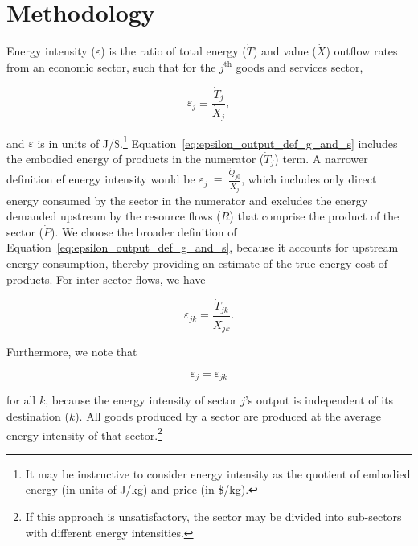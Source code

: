 \section{Methodology}

Energy intensity ($\varepsilon$)
is the ratio 
of total energy ($\dot{T}$) 
and value ($\dot{X}$) outflow rates 
from an economic sector, 
such that for the $j^{\mathrm{th}}$ goods and services sector,

\begin{equation} \label{eq:epsilon_output_def_g_and_s}
	\varepsilon_{j} \equiv \frac{\dot{T}_{j}}{\dot{X}_{j}},
\end{equation} 

\noindent{}and $\varepsilon$ is in units of J/\$.\footnote{It may be
instructive to consider energy intensity as the quotient
of embodied energy (in units of J/kg) and price (in \$/kg).}
Equation~\ref{eq:epsilon_output_def_g_and_s}
includes the embodied energy of products in the numerator ($\dot{T}_{j}$) term. 
A narrower definition ef energy intensity would be 
$\varepsilon_{j}~\equiv~\frac{\dot{Q}_{j0}}{\dot{X}_{j}}$,
which includes only direct energy consumed by the sector
in the numerator
and excludes the energy demanded upstream by the 
resource flows ($\dot{R}$) that comprise the product of the sector ($\dot{P}$).
We choose the broader definition of
Equation~\ref{eq:epsilon_output_def_g_and_s},
because it accounts for upstream energy consumption,
thereby providing an estimate of the true energy cost of products.
For inter-sector flows, we have

\begin{equation} \label{eq:epsilon_transfers_1}
	\varepsilon_{jk} = \frac{\dot{T}_{jk}}{\dot{X}_{jk}}.
\end{equation}

\noindent{}Furthermore, we note that 

\begin{equation} \label{eq:epsilon_equiv_1}
	\varepsilon_{j} = \varepsilon_{jk}
\end{equation}

\noindent{}for all $k$, because the energy intensity 
of sector $j$'s output is independent of its destination ($k$). 
All goods produced by a sector 
are produced at the average energy intensity 
of that sector.\footnote{If this approach is unsatisfactory, 
the sector may be divided into sub-sectors 
with different energy intensities.}

